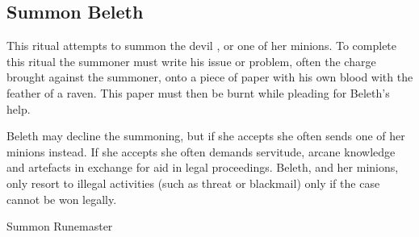 \subsection{Summon Beleth}
\label{sec:Summon Beleth}

This ritual attempts to summon the devil , or one of her
minions. To complete this ritual the summoner must write his issue or problem,
often the charge brought against the summoner, onto a piece of paper with his
own blood with the feather of a raven. This paper must then be burnt while
pleading for Beleth's help.

Beleth may decline the summoning, but if she accepts she often sends one of
her minions instead. If she accepts she often demands servitude, arcane
knowledge and artefacts in exchange for aid in legal proceedings. Beleth, and
her minions, only resort to illegal activities (such as threat or blackmail)
only if the case cannot be won legally.

\begin{35e}{Summon Runemaster}
\end{35e}
